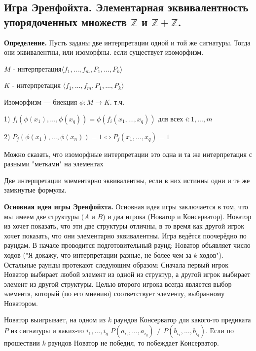 \subsection{Игра Эренфойхта. Элементарная эквивалентность упорядоченных множеств $\mathbb{Z}$ и $\mathbb{Z} + \mathbb{Z}$.}

\textbf{Определение.} Пусть заданы две интерпретации одной и той же сигнатуры. Тогда они эквивалентны, или изоморфны.
если существует изоморфизм.

$M$ - интерпретация$\langle f_1 , \ldots, f_m, P_1, \ldots, P_k\rangle $

$K$ - интерпретация $\langle f_1, \ldots, f_m, P_1, \ldots, P_k\rangle $

Изоморфизм — биекция $\phi: M \rightarrow K$. т.ч.

1) $f_i(\phi(x_1), \ldots, \phi(x_q))= \phi(f_i(x_1, \ldots, x_q))$ для всех $i: 1,..., m$

2) $P_j(\phi(x_1), \ldots, \phi(x_n))= 1 \Leftrightarrow P_j(x_1, \ldots, x_q)= 1$

Можно сказать, что изоморфные интерпретации это одна и та же интерпретация с разными "метками" на элементах

Две интерпретации элементарно эквивалентны, если в них истинны одни и те же замкнутые формулы.

\par
\textbf{Основная идея игры Эренфойхта.} Основная идея игры заключается в том, что мы имеем две структуры ($A$ и $B$) и два игрока (Новатор и Консерватор). Новатор из хочет показать, что эти две структуры отличны, в то время как другой игрок хочет показать, что они элементарно эквивалентны. Игра ведётся поочерёдно по раундам. В начале проводится подготовительный раунд: Новатор объявляет число ходов ("Я докажу, что интерпретации разные, не более чем за $k$ ходов"). Остальные раунды протекают следующим образом: Сначала первый игрок Новатор выбирает любой элемент из одной из структур, а другой игрок выбирает элемент из другой структуры. Целью второго игрока всегда является выбор элемента, который (по его мнению) соответствует элементу, выбранному Новатором.

Новатор выигрывает, на одном из $k$ раундов Консерватор для какого-то предиката $P$ из сигнатуры и каких-то $i_1, ..., i_q$ $P(a_{i_1}, ..., a_{i_q}) \neq P(b_{i_1}, ..., b_{i_q})$. Если по прошествии $k$ раундов Новатор не победил, то побеждает Консерватор.

